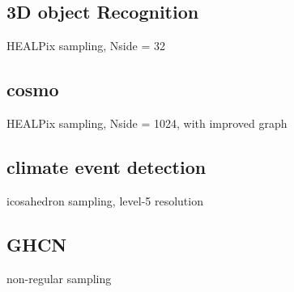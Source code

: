 \documentclass{article} %
\begin{document}
\subsection{3D object Recognition}
HEALPix sampling, Nside = 32

\subsection{cosmo}
HEALPix sampling, Nside = 1024, with improved graph

\subsection{climate event detection}
icosahedron sampling, level-5 resolution

\subsection{GHCN}
non-regular sampling
\end{document}
